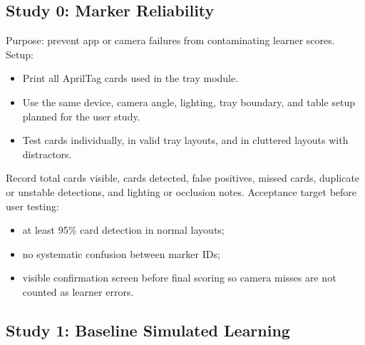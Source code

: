 \documentclass[10pt,a4paper]{article}
\begin{document}
\subsection{Study 0: Marker Reliability}
\label{sec:study-0}


Purpose: prevent app or camera failures from contaminating learner scores.
Setup:
\begin{itemize}
  \item Print all AprilTag cards used in the tray module.
  \item Use the same device, camera angle, lighting, tray boundary, and table setup planned for the user study.
  \item Test cards individually, in valid tray layouts, and in cluttered layouts with distractors.
\end{itemize}
Record total cards visible, cards detected, false positives, missed cards,
duplicate or unstable detections, and lighting or occlusion notes.
Acceptance target before user testing:
\begin{itemize}
  \item at least 95\% card detection in normal layouts;
  \item no systematic confusion between marker IDs;
  \item visible confirmation screen before final scoring so camera misses are not counted as learner errors.
\end{itemize}
\subsection{Study 1: Baseline Simulated Learning}
\end{document}
